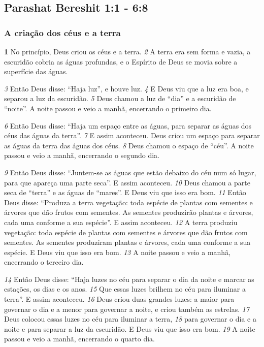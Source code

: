 \subsection*{Parashat Bereshit 1:1 - 6:8}
\subsubsection*{A criação dos céus e a terra}
\textbf{\large 1} 
No princípio, Deus criou os céus e a terra. 
\textit{\tiny 2} 
A   terra era sem forma e vazia, a
escuridão cobria as águas profundas, e o Espírito de Deus se movia sobre a superfície das águas. 

\bigskip
\textit{\tiny 3} 
Então Deus disse: “Haja luz”, e houve luz. 
\textit{\tiny 4} 
E Deus viu que a luz era boa, e separou a luz da escuridão. 
\textit{\tiny 5} Deus chamou a luz de “dia” e a escuridão de “noite”. A noite passou e veio a manhã, encerrando o primeiro dia.

\bigskip
\textit{\tiny 6} Então Deus disse: “Haja um espaço entre as águas, para separar as águas dos céus das águas da terra”. 
\textit{\tiny 7} 
E assim aconteceu. Deus criou um espaço para separar as águas da terra das águas dos céus. 
\textit{\tiny 8} 
Deus chamou o espaço de “céu”. A noite passou e veio a manhã, encerrando o segundo dia.

\bigskip
\textit{\tiny 9} 
Então     Deus disse: “Juntem-se as águas que estão debaixo do céu num só lugar, para que apareça uma parte seca”. E assim aconteceu. 
\textit{\tiny 10} 
Deus chamou a parte seca de “terra” e as águas de “mares”. E Deus viu que isso era bom. 
\textit{\tiny 11} 
Então Deus disse: “Produza a terra vegetação: toda espécie de plantas com sementes e árvores que dão frutos com sementes. As sementes produzirão plantas e árvores, cada uma conforme a sua espécie”. E assim aconteceu.
\textit{\tiny 12} 
A terra produziu vegetação: toda espécie de plantas com sementes e árvores que dão frutos com sementes. As sementes produziram plantas e árvores, cada uma conforme a sua espécie. E Deus viu que isso era bom.      
\textit{\tiny 13}
A noite passou e veio a manhã, encerrando o terceiro dia.

\bigskip
\textit{\tiny 14}
Então  Deus disse: “Haja luzes no céu para separar o dia da noite e marcar as estações, os dias e os anos. 
\textit{\tiny 15}
Que essas luzes brilhem no céu para iluminar a terra”. E assim aconteceu. 
\textit{\tiny 16}
Deus criou duas grandes luzes: a maior para governar o dia e a menor para governar a noite, e criou também as estrelas.
\textit{\tiny 17}
Deus colocou essas luzes no céu para iluminar a terra,
\textit{\tiny 18} 
para governar o dia e a noite e para separar a luz da escuridão. E Deus viu que isso era bom.
\textit{\tiny 19}
A noite passou e veio a manhã, encerrando o quarto dia.

